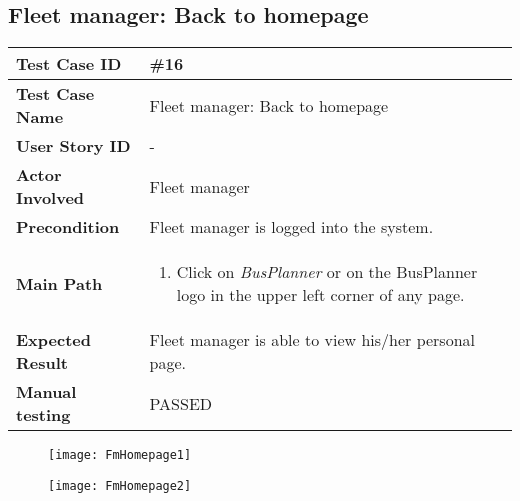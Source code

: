 \subsection{Fleet manager: Back to homepage}
\begin{center}
	\begin{tabular} { | m{3.5cm} | m{9.5cm} | }
		\hline
		\textbf{Test Case ID} & \#16\\
		\hline
		\textbf{Test Case Name} & Fleet manager: Back to homepage\\
		\hline
		\textbf{User Story ID} & - \\
		\hline
		\textbf{Actor Involved} & Fleet manager\\
		\hline
		\textbf{Precondition} & Fleet manager is logged into the system.\\
		\hline
		\textbf{Main Path} & 
		\begin{enumerate}
			\item Click on \textit{BusPlanner} or on the BusPlanner logo in the upper left corner of any page.
		\end{enumerate}\\
		\hline
		\textbf{Expected Result} & Fleet manager is able to view his/her personal page.\\
		\hline
	\textbf{Manual testing} & PASSED\\
	\hline
\end{tabular}
\end{center}
\begin{figure}[H]
\centering
\texttt{[image: FmHomepage1]}
\end{figure}
\begin{figure}[H]
\centering
\texttt{[image: FmHomepage2]}
\end{figure}
\newpage
